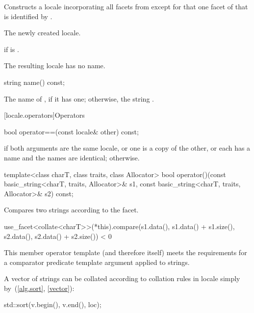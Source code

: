\begin{itemdescr}
\pnum
\effects
Constructs a locale incorporating
all facets from
except for that one facet of
that is identified by
.

\pnum
\returns
The newly created locale.

\pnum
\throws
{}
if
is .

\pnum
\remarks
The resulting locale has no name.
\end{itemdescr}

%
\begin{itemdecl}
string name() const;
\end{itemdecl}

\begin{itemdescr}
\pnum
\returns
The name of
,
if it has one; otherwise, the string .
\end{itemdescr}

[locale.operators]{Operators}

%
\begin{itemdecl}
bool operator==(const locale& other) const;
\end{itemdecl}

\begin{itemdescr}
\pnum
\returns
{}
if both arguments are the same locale, or one is a copy of the
other, or each has a name and the names are identical;
otherwise.
\end{itemdescr}

%
\begin{itemdecl}
template<class charT, class traits, class Allocator>
  bool operator()(const basic_string<charT, traits, Allocator>& s1,
                  const basic_string<charT, traits, Allocator>& s2) const;
\end{itemdecl}

\begin{itemdescr}
\pnum
\effects
Compares two strings according to the
facet.

\pnum
\returns
\begin{codeblock}
use_facet<collate<charT>>(*this).compare(s1.data(), s1.data() + s1.size(),
                                         s2.data(), s2.data() + s2.size()) < 0
\end{codeblock}

\pnum
\remarks
This member operator template (and therefore
itself) meets the requirements for a comparator predicate template argument
applied to strings.

\pnum
\begin{example}
A vector of strings
can be collated according to collation rules in locale
simply by~(\ref{alg.sort}, \ref{vector}):

\begin{codeblock}
std::sort(v.begin(), v.end(), loc);
\end{codeblock}
\end{example}
\end{itemdescr}


